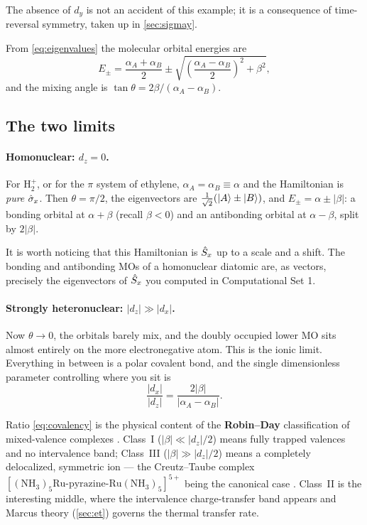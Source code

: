 \noindent
The absence of $d_y$ is not an accident of this example; it is a consequence of
time-reversal symmetry, taken up in \cref{sec:sigmay}.

From \cref{eq:eigenvalues} the molecular orbital energies are
%
\begin{equation}
E_{\pm} = \frac{\alpha_A+\alpha_B}{2} \pm \sqrt{\left(\frac{\alpha_A-\alpha_B}{2}\right)^{\!2} + \beta^2},
\label{eq:dimer-E}
\end{equation}
%
and the mixing angle is $\tan\theta = 2\beta/(\alpha_A-\alpha_B)$.

\subsection{The two limits}

\paragraph{Homonuclear: $d_z=0$.} For H$_2^+$, or for the $\pi$ system of ethylene,
$\alpha_A=\alpha_B\equiv\alpha$ and the Hamiltonian is \emph{pure} $\hat{\sigma}_x$. Then
$\theta=\pi/2$, the eigenvectors are $\tfrac{1}{\sqrt2}(\ket{A}\pm\ket{B})$, and
$E_\pm = \alpha \pm |\beta|$: a bonding orbital at $\alpha+\beta$ (recall $\beta<0$) and
an antibonding orbital at $\alpha-\beta$, split by $2|\beta|$.

It is worth noticing that this Hamiltonian is $\hat{S}_x$ up to a scale and a shift. The
bonding and antibonding MOs of a homonuclear diatomic are, as vectors, precisely the
eigenvectors of $\hat{S}_x$ you computed in Computational Set 1.

\paragraph{Strongly heteronuclear: $|d_z| \gg |d_x|$.} Now $\theta\to 0$, the orbitals
barely mix, and the doubly occupied lower MO sits almost entirely on the more
electronegative atom. This is the ionic limit. Everything in between is a polar
covalent bond, and the single dimensionless parameter controlling where you sit is
%
\begin{equation}
\frac{|d_x|}{|d_z|} = \frac{2|\beta|}{|\alpha_A-\alpha_B|}.
\label{eq:covalency}
\end{equation}

\begin{nbbox}
Ratio \eqref{eq:covalency} is the physical content of the \textbf{Robin--Day}
classification of mixed-valence complexes \cite{RobinDay}. Class~I ($|\beta|\ll|d_z|/2$)
means fully trapped valences and no intervalence band; Class~III
($|\beta|\gg|d_z|/2$) means a completely delocalized, symmetric ion --- the
Creutz--Taube complex
$[(\mathrm{NH_3})_5\mathrm{Ru}\text{-pyrazine-}\mathrm{Ru(NH_3)_5}]^{5+}$
being the canonical case \cite{CreutzTaube}. Class~II is the interesting middle, where
the intervalence charge-transfer band appears and Marcus theory (\cref{sec:et})
governs the thermal transfer rate.
\end{nbbox}

